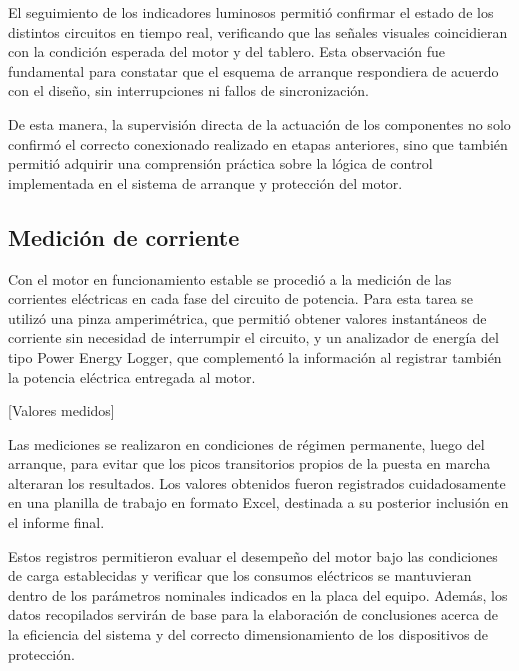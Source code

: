 El seguimiento de los indicadores luminosos permitió confirmar el estado de los distintos circuitos en tiempo real, verificando que las señales visuales coincidieran con la condición esperada del motor y del tablero. Esta observación fue fundamental para constatar que el esquema de arranque respondiera de acuerdo con el diseño, sin interrupciones ni fallos de sincronización.  

De esta manera, la supervisión directa de la actuación de los componentes no solo confirmó el correcto conexionado realizado en etapas anteriores, sino que también permitió adquirir una comprensión práctica sobre la lógica de control implementada en el sistema de arranque y protección del motor.

\subsection{Medición de corriente}

Con el motor en funcionamiento estable se procedió a la medición de las corrientes eléctricas en cada fase del circuito de potencia. Para esta tarea se utilizó una pinza amperimétrica, que permitió obtener valores instantáneos de corriente sin necesidad de interrumpir el circuito, y un analizador de energía del tipo Power Energy Logger, que complementó la información al registrar también la potencia eléctrica entregada al motor.  

[Valores medidos]

Las mediciones se realizaron en condiciones de régimen permanente, luego del arranque, para evitar que los picos transitorios propios de la puesta en marcha alteraran los resultados. Los valores obtenidos fueron registrados cuidadosamente en una planilla de trabajo en formato Excel, destinada a su posterior inclusión en el informe final.  

Estos registros permitieron evaluar el desempeño del motor bajo las condiciones de carga establecidas y verificar que los consumos eléctricos se mantuvieran dentro de los parámetros nominales indicados en la placa del equipo. Además, los datos recopilados servirán de base para la elaboración de conclusiones acerca de la eficiencia del sistema y del correcto dimensionamiento de los dispositivos de protección.
